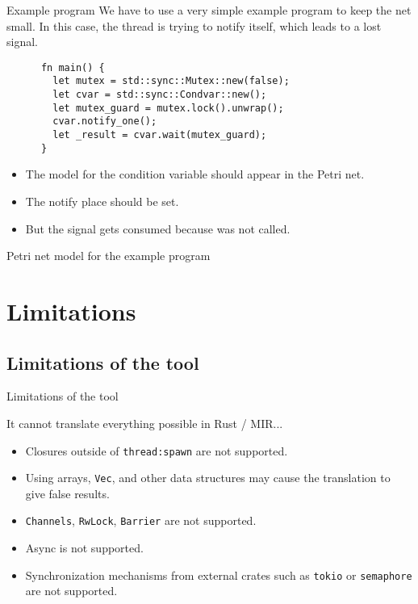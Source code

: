 \documentclass{beamer}
\begin{document}
\begin{frame}[fragile]{Example program}
  We have to use a very simple example program to keep the net small.
  In this case, the thread is trying to notify itself, which leads to a lost signal.

  \begin{listing}
    \begin{verbatim}
      fn main() {
        let mutex = std::sync::Mutex::new(false);
        let cvar = std::sync::Condvar::new();
        let mutex_guard = mutex.lock().unwrap();
        cvar.notify_one();
        let _result = cvar.wait(mutex_guard);
      }     
    \end{verbatim}
  \end{listing}

  \begin{itemize}
    \item The model for the condition variable should appear in the Petri net.
    \item The notify place should be set.
    \item But the signal gets consumed because  was not called.
  \end{itemize}
\end{frame}

\begin{frame}{Petri net model for the example program}
  \begin{figure}
    \centering
    
  \end{figure}
\end{frame}

\section{Limitations}

\subsection{Limitations of the tool}

\begin{frame}{Limitations of the tool}

  It cannot translate everything possible in Rust / MIR...

  \begin{itemize}
    \item Closures outside of \texttt{thread:spawn} are not supported.
    \item Using arrays, \texttt{Vec}, and other data structures may cause the translation to give false results.
    \item \texttt{Channels}, \texttt{RwLock}, \texttt{Barrier} are not supported.
    \item Async is not supported.
    \item Synchronization mechanisms from external crates such as \texttt{tokio} or \texttt{semaphore} are not supported.
  \end{itemize}
\end{frame}
\end{document}
